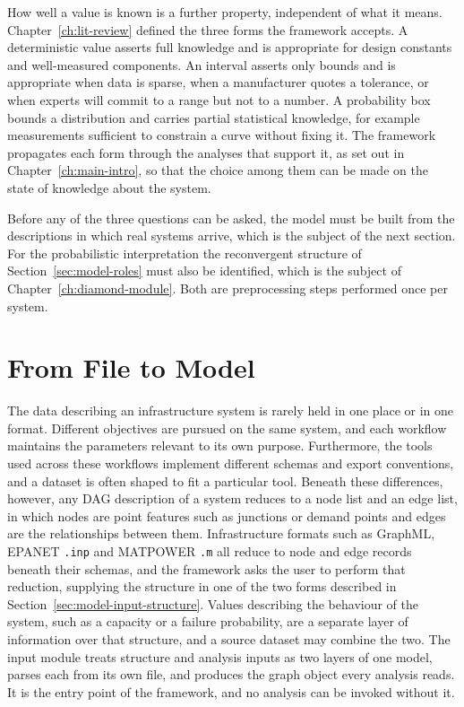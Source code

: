 \documentclass[12pt]{report}
\begin{document}
How well a value is known is a further property, independent of what it means.
Chapter~\ref{ch:lit-review} defined the three forms the framework accepts. A deterministic
value asserts full knowledge and is appropriate for design constants and well-measured
components. An interval asserts only bounds and is appropriate when data is sparse, when a
manufacturer quotes a tolerance, or when experts will commit to a range but not to a number. A
probability box bounds a distribution and carries partial statistical knowledge, for example
measurements sufficient to constrain a curve without fixing it. The framework propagates each
form through the analyses that support it, as set out in Chapter~\ref{ch:main-intro}, so that
the choice among them can be made on the state of knowledge about the system.

Before any of the three questions can be asked, the model must be built from the descriptions
in which real systems arrive, which is the subject of the next section. For the
probabilistic interpretation the reconvergent structure of Section~\ref{sec:model-roles} must
also be identified, which is the subject of Chapter~\ref{ch:diamond-module}. Both are
preprocessing steps performed once per system.

\section{From File to Model}
\label{sec:model-input}

The data describing an infrastructure system is rarely held in one place or in one format.
Different objectives are pursued on the same system, and each workflow maintains the parameters
relevant to its own purpose. Furthermore, the tools used across these workflows implement different schemas and export
conventions, and a dataset is often shaped to fit a particular tool. Beneath these
differences, however, any DAG description of a system reduces to a node list and an edge list, in which
nodes are point features such as junctions or demand points and edges are the
relationships between them. Infrastructure formats such as GraphML, EPANET
\texttt{.inp} and MATPOWER \texttt{.m} all reduce to node and edge records beneath their
schemas, and the framework asks the user to perform that reduction, supplying the structure in
one of the two forms described in Section~\ref{sec:model-input-structure}. Values describing the behaviour of the system, such as a capacity or a failure
probability, are a separate layer of information over that structure, and a source dataset may
combine the two. The input module treats structure and analysis inputs as two layers of one
model, parses each from its own file, and produces the graph object every analysis reads. It is the entry point of the framework, and no analysis can be invoked without it.
\end{document}
